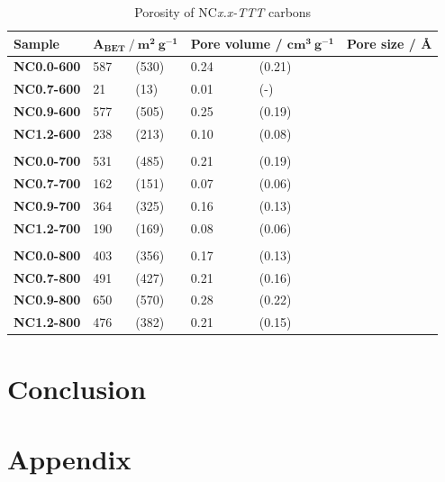 \begin{table}[h]
    \caption{Porosity of NC\textit{x.x-TTT} carbons}
    \label{tb:nc_porosity}
    \begin{tabularx}{\textwidth}{llllXll}
    \toprule
        \textbf{Sample} & \multicolumn{2}{l}{$\mathbf{A_{BET}\ /\ m^2\ g^{-1}}$}  & \multicolumn{2}{l}{\textbf{Pore volume} / $\mathbf{cm^3\ g^{-1}}$} & \multicolumn{2}{l}{\textbf{Pore size / \AA}} \\
    \midrule
        \textbf{NC0.0-600} & 587 & (530) & 0.24 & (0.21) & \\
        \textbf{NC0.7-600} & 21 & (13) & 0.01 & (-) & \\
        \textbf{NC0.9-600} & 577 & (505) & 0.25 & (0.19) & \\
        \textbf{NC1.2-600} & 238 & (213) & 0.10 & (0.08) & \\
        \\
        \textbf{NC0.0-700} & 531 & (485) & 0.21 & (0.19) & \\
        \textbf{NC0.7-700} & 162 & (151) & 0.07 & (0.06) & \\
        \textbf{NC0.9-700} & 364 & (325) & 0.16 & (0.13) & \\
        \textbf{NC1.2-700} & 190 & (169) & 0.08 & (0.06) & \\
        \\
        \textbf{NC0.0-800} & 403 & (356) & 0.17 & (0.13) & \\
        \textbf{NC0.7-800} & 491 & (427) & 0.21 & (0.16) & \\
        \textbf{NC0.9-800} & 650 & (570) & 0.28 & (0.22) & \\
        \textbf{NC1.2-800} & 476 & (382) & 0.21 & (0.15) & \\
    \bottomrule
    \end{tabularx}
\end{table}

\section{Conclusion}




\section*{Appendix}